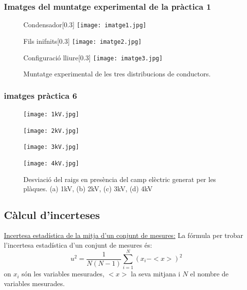 \documentclass[11pt]{article}
\numberwithin{equation}{section}
\numberwithin{figure}{section}
\numberwithin{table}{section}
\begin{document}
\subsubsection{Imatges del muntatge experimental de la pràctica 1}\label{fotos}
\begin{figure}[H]
    \centering

    \begin{subcaptionbox}{Condensador\label{fig:img1}}[0.3\textwidth]
        {\texttt{[image: imatge1.jpg]}}
    \end{subcaptionbox}
    \hfill
    \begin{subcaptionbox}{Fils inifnits\label{fig:img2}}[0.3\textwidth]
        {\texttt{[image: imatge2.jpg]}}
    \end{subcaptionbox}
    \hfill
    \begin{subcaptionbox}{Configuració lliure\label{fig:img3}}[0.3\textwidth]
        {\texttt{[image: imatge3.jpg]}}
    \end{subcaptionbox}

    \caption{Muntatge experimental de les tres distribucions de conductors.}
    \label{fig:figura3}
\end{figure}
\subsubsection{imatges pràctica 6}
\begin{figure}[H]
    \centering
    \begin{minipage}{0.38\textwidth}
        \centering
        \texttt{[image: 1kV.jpg]}
    \end{minipage}
    \begin{minipage}{0.38\textwidth}
        \centering
        \texttt{[image: 2kV.jpg]}
    \end{minipage}
    \begin{minipage}{0.38\textwidth}
        \centering
        \texttt{[image: 3kV.jpg]}
    \end{minipage}
    \begin{minipage}{0.38\textwidth}
        \centering
        \texttt{[image: 4kV.jpg]}
    \end{minipage}
    \caption{Desviació del raigs en presència del camp elèctric generat per les plàques. (a) 1kV, (b) 2kV, (c) 3kV, (d) 4kV}
    \label{fig: Desv E}
\end{figure}
\subsection{Càlcul d'incerteses}
\underline{Incertesa estadística de la mitja d'un conjunt de mesures:} La fórmula per trobar l'incertesa estadística d'un conjunt de mesures és:
\begin{equation} \label{eq: incertesa estadística}
    u^2 = \frac{1}{N(N-1)} \sum_{i=1}^{N} (x_i - <x>)^2
\end{equation}
on ${x_i}$ són les variables mesurades, $<x>$ la seva mitjana i $N$ el nombre de variables mesurades.
\end{document}
